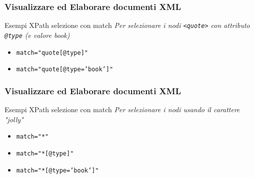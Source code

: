 \begin{frame}
    \frametitle{Visualizzare ed Elaborare documenti XML}
    \addtocounter{nframe}{1}
    

    \begin{block}{Esempi XPath selezione con match}
        \emph{Per selezionare i nodi \texttt{<quote>} con attributo \texttt{@type} (e valore \textit{book})}
        \begin{itemize}
            \item \texttt{match="quote[@type]"}
            \item \texttt{match="quote[@type='book']"}
        \end{itemize}
        
    \end{block}
    
\end{frame}


\begin{frame}
    \frametitle{Visualizzare ed Elaborare documenti XML}
    \addtocounter{nframe}{1}
    

    \begin{block}{Esempi XPath selezione con match}
        \emph{Per selezionare i nodi usando il carattere "jolly"}
        \begin{itemize}
            \item \texttt{match="*"}
            \item \texttt{match="*[@type]"}
            \item \texttt{match="*[@type='book']"}
        \end{itemize}
    \end{block}
    
\end{frame}


